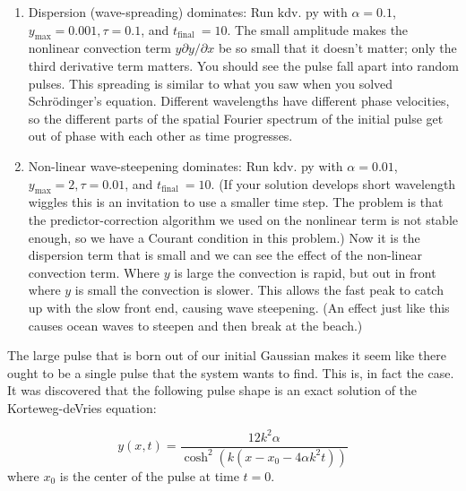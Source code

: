 \begin{problem}\label{P12.4}
\begin{enumerate}[label=(\alph*)]
\item Dispersion (wave-spreading) dominates: Run $\mathrm{kdv}$. py with $\alpha=0.1$, $y_{\max }=0.001, \tau=0.1$, and $t_{\text {final }}=10$. The small amplitude makes the nonlinear convection term $y \partial y / \partial x$ be so small that it doesn't matter; only the third derivative term matters. You should see the pulse fall apart into random pulses. This spreading is similar to what you saw when you solved Schrödinger's equation. Different wavelengths have different phase velocities, so the different parts of the spatial Fourier spectrum of the initial pulse get out of phase with each other as time progresses.
\item Non-linear wave-steepening dominates: Run $\mathrm{kdv}$. py with $\alpha=0.01$, $y_{\max }=2, \tau=0.01$, and $t_{\text {final }}=10$. (If your solution develops short wavelength wiggles this is an invitation to use a smaller time step. The problem is that the predictor-correction algorithm we used on the nonlinear term is not stable enough, so we have a Courant condition in this problem.)
Now it is the dispersion term that is small and we can see the effect of the non-linear convection term. Where $y$ is large the convection is rapid, but out in front where $y$ is small the convection is slower. This allows the fast peak to catch up with the slow front end, causing wave steepening. (An effect just like this causes ocean waves to steepen and then break at the beach.)
\end{enumerate}
\end{problem}
The large pulse that is born out of our initial Gaussian makes it seem like
there ought to be a single pulse that the system wants to find. This is, in fact the
case. It was discovered that the following pulse shape is an exact solution of the
Korteweg-deVries equation:


\begin{equation}\label{eq:1214}
y(x, t)=\frac{12 k^{2} \alpha}{\cosh ^{2}\left(k\left(x-x_{0}-4 \alpha k^{2} t\right)\right)}
\end{equation}
where $x_0$ is the center of the pulse at time $t = 0$.


